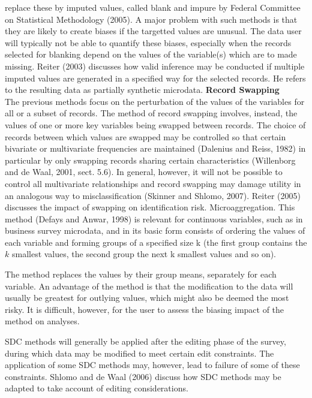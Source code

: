 replace these by imputed values, called blank and impure by Federal Committee on
Statistical Methodology (2005). A major problem with such methods is that they are
likely to create biases if the targetted values are unusual. The data user will typically not
be able to quantify these biases, especially when the records selected for blanking depend
on the values of the variable(s) which are to made missing. Reiter (2003) discusses how
valid inference may be conducted if multiple imputed values are generated in a specified
way for the selected records. He refers to the resulting data as partially synthetic
microdata.
\noindent \textbf{Record Swapping}\\
The previous methods focus on the perturbation of the values of
the variables for all or a subset of records. The method of record swapping involves,
instead, the values of one or more key variables being swapped between records. The
choice of records between which values are swapped may be controlled so that certain
bivariate or multivariate frequencies are maintained (Dalenius and Reiss, 1982) in
particular by only swapping records sharing certain characteristics (Willenborg and de
Waal, 2001, sect. 5.6). In general, however, it will not be possible to control all
multivariate relationships and record swapping may damage utility in an analogous way
to misclassification (Skinner and Shlomo, 2007). Reiter (2005) discusses the impact of
swapping on identification risk.
Microaggregation. This method (Defays and Anwar, 1998) is relevant for continuous
variables, such as in business survey microdata, and in its basic form consists of ordering
the values of each variable and forming groups of a specified size k (the first group
contains the $k$ smallest values, the second group the next k smallest values and so on).

The method replaces the values by their group means, separately for each variable. An
advantage of the method is that the modification to the data will usually be greatest for
outlying values, which might also be deemed the most risky. It is difficult, however, for
the user to assess the biasing impact of the method on analyses.

SDC methods will generally be applied after the editing phase of the survey, during
which data may be modified to meet certain edit constraints. The application of some
SDC methods may, however, lead to failure of some of these constraints. Shlomo and de
Waal (2006) discuss how SDC methods may be adapted to take account of editing
considerations.

